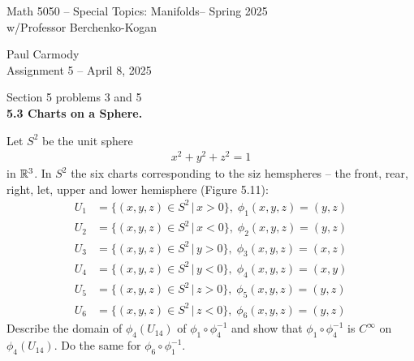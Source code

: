 \documentclass[10pt,a4paper]{report}
\newcommand{\CLASSNAME}{Math 5050 -- Special Topics: Manifolds}
\newcommand{\STUDENTNAME}{Paul Carmody}
\newcommand{\ASSIGNMENT}{Assignment 5 }
\newcommand{\DUEDATE}{April 8, 2025}
\newcommand{\SEMESTER}{Spring 2025}
\begin{document}
\begin{center}
	\Large{\CLASSNAME -- \SEMESTER} \\
	\large{ w/Professor Berchenko-Kogan}
\end{center}
\begin{center}
	\STUDENTNAME \\
	\ASSIGNMENT -- \DUEDATE\\
\end{center} 

\noindent Section 5 problems 3 and 5 \\

\noindent\textbf{5.3 Charts on a Sphere.}

Let $S^2$ be the unit sphere 
\begin{align*}
	x^2+y^2+z^2=1
\end{align*}in $\mathbb{R}^3$.  	In $S^2$ the six charts corresponding to the siz hemspheres -- the front, rear, right, let, upper and lower hemisphere (Figure 5.11):
\begin{align*}
	U_1 &= \{(x,y,z) \in S^2\,|\, x > 0\}, \; \phi_1(x,y,z) = (y,z) \\
	U_2 &= \{(x,y,z) \in S^2\,|\, x < 0\}, \; \phi_2(x,y,z) = (y,z) \\
	U_3 &= \{(x,y,z) \in S^2\,|\, y > 0\}, \; \phi_3(x,y,z) = (x,z) \\
	U_4 &= \{(x,y,z) \in S^2\,|\, y < 0\}, \; \phi_4(x,y,z) = (x,y) \\
	U_5 &= \{(x,y,z) \in S^2\,|\, z > 0\}, \; \phi_5(x,y,z) = (y,z) \\
	U_6 &= \{(x,y,z) \in S^2\,|\, z < 0\}, \; \phi_6(x,y,z) = (y,z) 
\end{align*}Describe the domain of $\phi_4(U_{14})$ of $\phi_1\circ \phi_4^{-1}$ and show that $\phi_1\circ\phi_4^{-1}$ is $ C^\infty$ on $\phi_4(U_{14})$.  Do the same for $\phi_6\circ \phi_1^{-1}$.
\end{document}
